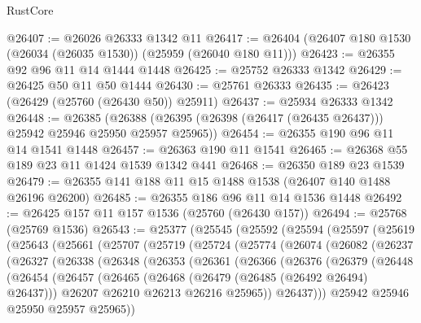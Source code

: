 \begin{lexlean}{RustCore}
\begin{coremodule}
@26407 := @26026 @26333 @1342 @11
@26417 := @26404 (@26407 @180 @1530 (@26034 (@26035 @1530)) (@25959 (@26040 @180 @11)))
@26423 := @26355 @92 @96 @11 @14 @1444 @1448
@26425 := @25752 @26333 @1342
@26429 := @26425 @50 @11 @50 @1444
@26430 := @25761 @26333
@26435 := @26423 (@26429 (@25760 (@26430 @50)) @25911)
@26437 := @25934 @26333 @1342
@26448 := @26385
    (@26388 (@26395 (@26398 (@26417 (@26435 @26437))) @25942 @25946 @25950 @25957 @25965))
@26454 := @26355 @190 @96 @11 @14 @1541 @1448
@26457 := @26363 @190 @11 @1541
@26465 := @26368 @55 @189 @23 @11 @1424 @1539 @1342 @441
@26468 := @26350 @189 @23 @1539
@26479 := @26355 @141 @188 @11 @15 @1488 @1538 (@26407 @140 @1488 @26196 @26200)
@26485 := @26355 @186 @96 @11 @14 @1536 @1448
@26492 := @26425 @157 @11 @157 @1536 (@25760 (@26430 @157))
@26494 := @25768 (@25769 @1536)
@26543 := @25377
    (@25545
      (@25592
        (@25594
          (@25597
            (@25619
              (@25643
                (@25661
                  (@25707
                    (@25719
                      (@25724
                        (@25774
                          (@26074
                            (@26082
                              (@26237
                                (@26327
                                  (@26338
                                    (@26348
                                      (@26353
                                        (@26361
                                          (@26366
                                            (@26376
                                              (@26379
                                                (@26448
                                                  (@26454
                                                    (@26457
                                                      (@26465
                                                        (@26468
                                                          (@26479 (@26485 (@26492 @26494) @26437)))
                                                        @26207
                                                        @26210
                                                        @26213
                                                        @26216
                                                        @25965))
                                                    @26437)))
                                              @25942
                                              @25946
                                              @25950
                                              @25957
                                              @25965))

\end{coremodule}
\end{lexlean}
